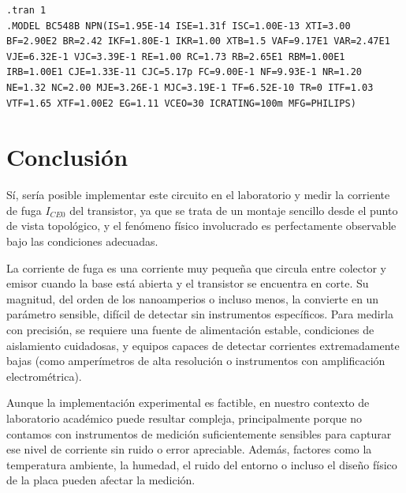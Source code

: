 \begin{lstlisting}[style=ltspice, caption={Parámetros de simulación LTspice}]
.tran 1
.MODEL BC548B NPN(IS=1.95E-14 ISE=1.31f ISC=1.00E-13 XTI=3.00 BF=2.90E2 BR=2.42 IKF=1.80E-1 IKR=1.00 XTB=1.5 VAF=9.17E1 VAR=2.47E1 VJE=6.32E-1 VJC=3.39E-1 RE=1.00 RC=1.73 RB=2.65E1 RBM=1.00E1 IRB=1.00E1 CJE=1.33E-11 CJC=5.17p FC=9.00E-1 NF=9.93E-1 NR=1.20 NE=1.32 NC=2.00 MJE=3.26E-1 MJC=3.19E-1 TF=6.52E-10 TR=0 ITF=1.03 VTF=1.65 XTF=1.00E2 EG=1.11 VCEO=30 ICRATING=100m MFG=PHILIPS)
\end{lstlisting}

\section{Conclusión}

Sí, sería posible implementar este circuito en el laboratorio y medir la corriente de fuga $I_{CE0}$ del transistor, ya que se trata de un montaje sencillo desde el punto de vista topológico, y el fenómeno físico involucrado es perfectamente observable bajo las condiciones adecuadas.

La corriente de fuga es una corriente muy pequeña que circula entre colector y emisor cuando la base está abierta y el transistor se encuentra en corte. Su magnitud, del orden de los nanoamperios o incluso menos, la convierte en un parámetro sensible, difícil de detectar sin instrumentos específicos. Para medirla con precisión, se requiere una fuente de alimentación estable, condiciones de aislamiento cuidadosas, y equipos capaces de detectar corrientes extremadamente bajas (como amperímetros de alta resolución o instrumentos con amplificación electrométrica).

Aunque la implementación experimental es factible, en nuestro contexto de laboratorio académico puede resultar compleja, principalmente porque no contamos con instrumentos de medición suficientemente sensibles para capturar ese nivel de corriente sin ruido o error apreciable. Además, factores como la temperatura ambiente, la humedad, el ruido del entorno o incluso el diseño físico de la placa pueden afectar la medición.

\newpage
